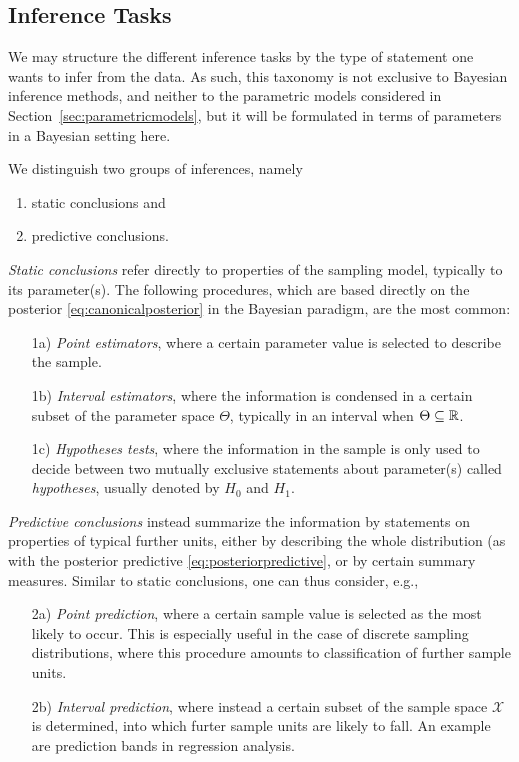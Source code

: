 \subsection{Inference Tasks}
\label{sec:inferencetasks}

We may structure the different inference tasks by
the type of statement one wants to infer from the data.
As such, this taxonomy is not exclusive to Bayesian inference methods,
and neither to the parametric models considered in Section~\ref{sec:parametricmodels},
but it will be formulated in terms of parameters in a Bayesian setting here.

We distinguish two groups of inferences, namely
\begin{enumerate}
\item static conclusions and
\item predictive conclusions.%
\end{enumerate}

\emph{Static conclusions} refer directly to properties of the sampling model, typically to its parameter(s).
The following procedures, which are based directly on the posterior \eqref{eq:canonicalposterior} in the Bayesian paradigm,
are the most common:
\begin{enumerate}
\item[1a)] \emph{Point estimators},
where a certain parameter value is selected to describe the sample.
\item[1b)] \emph{Interval estimators},
where the information is condensed in a certain subset of the parameter space $\Theta$, typically in an interval when $\Theta \subseteq \mathbb{R}$.
\item[1c)] \emph{Hypotheses tests},
where the information in the sample is only used to decide between two mutually exclusive statements about parameter(s) called \emph{hypotheses},
usually denoted by $H_0$ and $H_1$.
\end{enumerate}

\emph{Predictive conclusions} instead summarize the information by statements on properties of typical further units,
either by describing the whole distribution (as with the posterior predictive \eqref{eq:posteriorpredictive},
or by certain summary measures.
Similar to static conclusions, one can thus consider, e.g.,
\begin{enumerate}
\item[2a)] \emph{Point prediction},
where a certain sample value is selected as the most likely to occur.
This is especially useful in the case of discrete sampling distributions,
where this procedure amounts to classification of further sample units.
\item[2b)] \emph{Interval prediction},
where instead a certain subset of the sample space $\mathcal{X}$ is determined,
into which furter sample units are likely to fall.
An example are prediction bands in regression analysis.
\end{enumerate}

